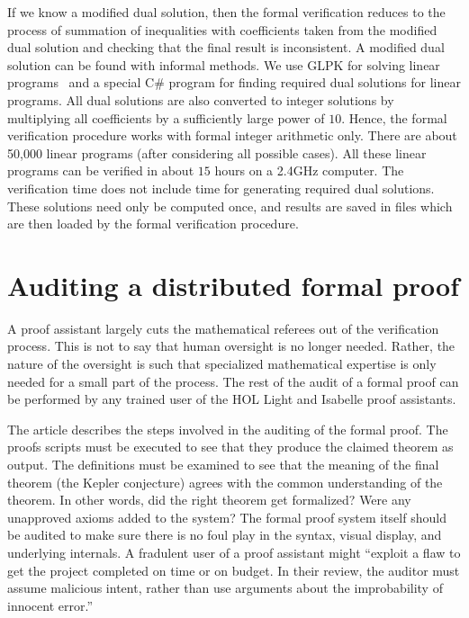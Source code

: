 If we know a modified dual solution, then the formal verification
reduces to the process of summation of inequalities with coefficients
taken from the modified dual solution and checking that the final
result is inconsistent. A modified dual solution can be found with
informal methods. We use GLPK for solving linear
programs~\cite{website:GLPK} and a special C\# program for finding
required dual solutions for linear programs. All dual solutions are
also converted to integer solutions by multiplying all coefficients
by a sufficiently large power of $10$. Hence, the formal verification
procedure works with formal integer arithmetic only. There are about
50,000 linear programs (after considering all possible cases). All
these linear programs can be verified in about $15$ hours on a 2.4GHz
computer. The verification time does not include time for generating
required dual solutions. These solutions need only be computed once,
and results are saved in files which are then loaded by the formal
verification procedure.


\section{Auditing a distributed formal proof}

A proof assistant largely cuts the mathematical referees out of the
verification process.  This is not to say that human oversight is no
longer needed.  Rather, the nature of the oversight is such that
specialized mathematical expertise is only needed for a small
part of the process.  The rest of the audit of a formal proof can be
performed by any trained user of the HOL Light and Isabelle proof
assistants.

The article \cite{XX-Adams} describes the steps involved in the
auditing of the formal proof.  The proofs scripts must be executed to
see that they produce the claimed theorem as output.  The definitions
must be examined to see that the meaning of the final theorem (the
Kepler conjecture) agrees with the common understanding of the
theorem.  In other words, did the right theorem get formalized?  Were
any unapproved axioms added to the system?  The formal proof system
itself should be audited to make sure there is no foul play in the
syntax, visual display, and underlying internals.  A fradulent user of
a proof assistant might ``exploit a flaw to get the project completed
on time or on budget.  In their review, the auditor must assume
malicious intent, rather than use arguments about the improbability of
innocent error.''

